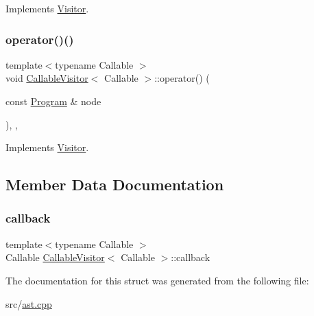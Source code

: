 Implements \hyperlink{struct_visitor_a73daac2b555cca03beaf9da73bf540c7}{Visitor}.

\mbox{\label{struct_callable_visitor_a37e48e9df8cb4cff6bc135e7402a7244}} 
\subsubsection{\texorpdfstring{operator()()}{operator()()}\hspace{0.1cm}{\footnotesize\ttfamily [44/44]}}
{\footnotesize\ttfamily template$<$typename Callable $>$ \\
void \hyperlink{struct_callable_visitor}{Callable\+Visitor}$<$ Callable $>$\+::operator() (\begin{DoxyParamCaption}\item[{const \hyperlink{struct_program}{Program} \&}]{node }\end{DoxyParamCaption})\hspace{0.3cm}{\ttfamily [inline]}, {\ttfamily [override]}, {\ttfamily [virtual]}}



Implements \hyperlink{struct_visitor_a768e64f6e6fffb7440e3c1f1a78d9481}{Visitor}.



\subsection{Member Data Documentation}
\mbox{\label{struct_callable_visitor_a52ce52c399eb34a2a16abec3361e48b8}} 
\subsubsection{\texorpdfstring{callback}{callback}}
{\footnotesize\ttfamily template$<$typename Callable $>$ \\
Callable \hyperlink{struct_callable_visitor}{Callable\+Visitor}$<$ Callable $>$\+::callback}



The documentation for this struct was generated from the following file\+:\begin{DoxyCompactItemize}
\item 
src/\hyperlink{ast_8cpp}{ast.\+cpp}\end{DoxyCompactItemize}
